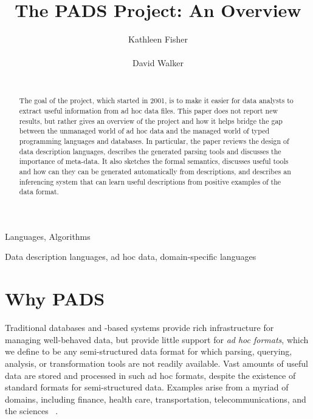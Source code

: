 \documentclass{sig-alternate}
\begin{document}
\title{The PADS Project: An Overview}
\author{
\alignauthor
Kathleen Fisher\\
  \\
\alignauthor
David Walker\\
  \\
  }



\maketitle{}

\begin{abstract}  
  The goal of the \pads{} project, which started in 2001, is to make
  it easier for data analysts to extract useful information from ad
  hoc data files.  This paper does not report new results, but rather
  gives an overview of the project
  and how it helps bridge
the gap between the unmanaged world of ad hoc data and
the managed world of typed programming languages and
databases.
  In particular, the paper reviews the design of \pads{}
  data description languages, describes the generated parsing
  tools and discusses the importance of meta-data.  It also sketches the formal
  semantics, discusses useful tools and how can they can be
  generated automatically from \pads{} descriptions, and describes
  an inferencing system that can learn useful \pads{}
  descriptions from positive examples of the data format.
\end{abstract}


\terms
Languages, Algorithms

\keywords
Data description languages, ad hoc data,  domain-specific languages


\section {Why PADS}
\label{sec:intro}

Traditional databases and \xml{}-based systems provide rich
infrastructure for managing well-behaved data, but provide little
support for \textit{ad hoc formats}, which we define to be any
semi-structured data format for which parsing, querying, analysis, or
transformation tools are not readily available.  Vast amounts of
useful data are stored and processed in such ad hoc formats, despite
the existence of standard formats for semi-structured data.  Examples
arise from a myriad of domains, including finance, health care,
transportation, telecommunications, and the sciences ~\cite{fisher+:pads}. 
\end{document}
